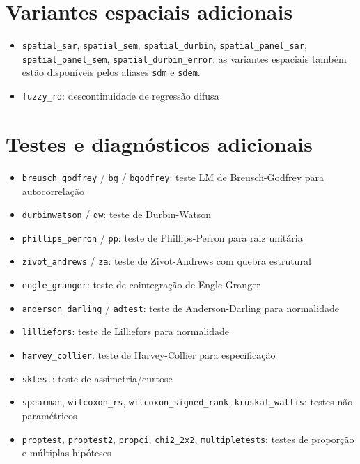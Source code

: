 \section{Variantes espaciais adicionais}

\begin{itemize}
\item \texttt{spatial\_sar}, \texttt{spatial\_sem}, \texttt{spatial\_durbin},
      \texttt{spatial\_panel\_sar}, \texttt{spatial\_panel\_sem},
      \texttt{spatial\_durbin\_error}: as variantes espaciais também estão
      disponíveis pelos aliases \texttt{sdm} e \texttt{sdem}.
\item \texttt{fuzzy\_rd}: descontinuidade de regressão difusa
\end{itemize}

\section{Testes e diagnósticos adicionais}

\begin{itemize}
\item \texttt{breusch\_godfrey} / \texttt{bg} / \texttt{bgodfrey}: teste LM de
      Breusch-Godfrey para autocorrelação
\item \texttt{durbinwatson} / \texttt{dw}: teste de Durbin-Watson
\item \texttt{phillips\_perron} / \texttt{pp}: teste de Phillips-Perron para
      raiz unitária
\item \texttt{zivot\_andrews} / \texttt{za}: teste de Zivot-Andrews com quebra
      estrutural
\item \texttt{engle\_granger}: teste de cointegração de Engle-Granger
\item \texttt{anderson\_darling} / \texttt{adtest}: teste de Anderson-Darling
      para normalidade
\item \texttt{lilliefors}: teste de Lilliefors para normalidade
\item \texttt{harvey\_collier}: teste de Harvey-Collier para
      especificação
\item \texttt{sktest}: teste de assimetria/curtose
\item \texttt{spearman}, \texttt{wilcoxon\_rs}, \texttt{wilcoxon\_signed\_rank},
      \texttt{kruskal\_wallis}: testes não paramétricos
\item \texttt{proptest}, \texttt{proptest2}, \texttt{propci}, \texttt{chi2\_2x2},
      \texttt{multipletests}: testes de proporção e múltiplas hipóteses
\end{itemize}

